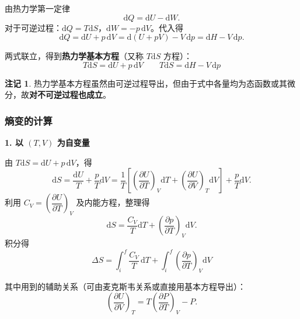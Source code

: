 \documentclass[UTF8]{ctexart}
\theoremstyle{definition}
\newtheorem{remark}{注记}
\begin{document}
由热力学第一定律
\begin{equation}
\mathrm{d}Q=\mathrm{d}U-\mathrm{d}W.
\end{equation}
对于可逆过程：$\mathrm{d}Q=T\mathrm{d}S$，$\mathrm{d}W=-p\,\mathrm{d}V$。代入得
\begin{equation}
\mathrm{d}Q=\mathrm{d}U+p\,\mathrm{d}V=\mathrm{d}(U+pV)-V\,\mathrm{d}p=\mathrm{d}H-V\,\mathrm{d}p.
\end{equation}

两式联立，得到\textbf{热力学基本方程}（又称 $T\mathrm{d}S$ 方程）：
\begin{equation}
\boxed{T\mathrm{d}S=\mathrm{d}U+p\,\mathrm{d}V}
\qquad
\boxed{T\mathrm{d}S=\mathrm{d}H-V\,\mathrm{d}p}
\end{equation}

\begin{remark}
    热力学基本方程虽然由可逆过程导出，但由于式中各量均为态函数或其微分，故\textbf{对不可逆过程也成立}。
\end{remark}

\subsubsection*{熵变的计算}

\textbf{1. 以 $(T,V)$ 为自变量}

由 $T\mathrm{d}S=\mathrm{d}U+p\,\mathrm{d}V$，得
\begin{equation}
\mathrm{d}S=\frac{\mathrm{d}U}{T}+\frac{p}{T}\mathrm{d}V
=\frac{1}{T}\left[\left(\frac{\partial U}{\partial T}\right)_V\mathrm{d}T+\left(\frac{\partial U}{\partial V}\right)_T\mathrm{d}V\right]+\frac{p}{T}\mathrm{d}V.
\end{equation}
利用 $C_V=\left(\dfrac{\partial U}{\partial T}\right)_V$ 及内能方程，整理得
\begin{equation}
\mathrm{d}S=\frac{C_V}{T}\mathrm{d}T+\left(\frac{\partial p}{\partial T}\right)_V\mathrm{d}V.
\end{equation}
积分得
\begin{equation}
\boxed{\Delta S=\int_i^f\frac{C_V}{T}\,\mathrm{d}T+\int_i^f\left(\frac{\partial p}{\partial T}\right)_V\mathrm{d}V}
\end{equation}

其中用到的辅助关系（可由麦克斯韦关系或直接用基本方程导出）：
\begin{equation}
\left(\frac{\partial U}{\partial V}\right)_T=T\left(\frac{\partial P}{\partial T}\right)_V-P.
\end{equation}
\end{document}

